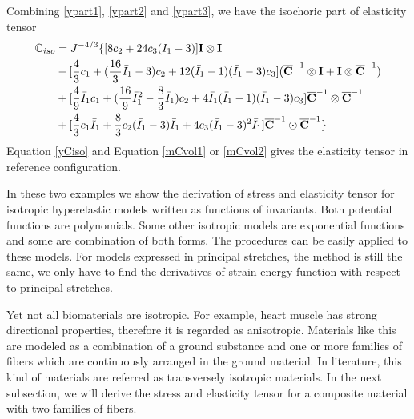 Combining \ref{ypart1}, \ref{ypart2} and \ref{ypart3}, we have the isochoric part of elasticity tensor
\begin{equation} \label{yCiso}
\begin{split}
{\mathbb{C}}_{iso} &= J^{-4/3} \{
[8c_2+24c_3({\bar{I}}_1 - 3)] \bold{I} \otimes \bold{I} \\
&- [\frac{4}{3}c_1 + (\frac{16}{3}{\bar{I}}_1 - 3)c_2 + 12({\bar{I}}_1 - 1)({\bar{I}}_1 - 3)c_3]({\overline{\bold{C}}}^{-1} \otimes \bold{I} + \bold{I} \otimes {\overline{\bold{C}}}^{-1})\\
&+ [\frac{4}{9}{\bar{I}}_1c_1 + (\frac{16}{9}{{\bar{I}}_1}^2 - \frac{8}{3}{\bar{I}}_1)c_2 + 4{\bar{I}}_1({\bar{I}}_1 - 1)({\bar{I}}_1 - 3)c_3] {\overline{\bold{C}}}^{-1} \otimes {\overline{\bold{C}}}^{-1} \\
&+ [\frac{4}{3}c_1{\bar{I}}_1 + \frac{8}{3}c_2({\bar{I}}_1 - 3){\bar{I}}_1 + 4c_3({\bar{I}}_1 - 3)^2{\bar{I}}_1]{\overline{\bold{C}}}^{-1} \odot {\overline{\bold{C}}}^{-1}
\}
\end{split}
\end{equation}
Equation \ref{yCiso} and Equation \ref{mCvol1} or \ref{mCvol2} gives the elasticity tensor in reference configuration.

In these two examples we show the derivation of stress and elasticity tensor for isotropic hyperelastic models written as functions of invariants. Both potential functions are polynomials. Some other isotropic models are exponential functions and some are combination of both forms. The procedures can be easily applied to these models. For models expressed in principal stretches, the method is still the same, we only have to find the derivatives of strain energy function with respect to principal stretches.

Yet not all biomaterials are isotropic. For example, heart muscle has strong directional properties, therefore it is regarded as anisotropic. Materials like this are modeled as a combination of a ground substance and one or more families of fibers which are continuously arranged in the ground material. In literature, this kind of materials are referred as transversely isotropic materials. In the next subsection, we will derive the stress and elasticity tensor for a composite material with two families of fibers.

%
